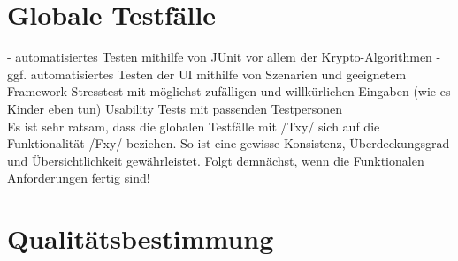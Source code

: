 \documentclass{article}
\begin{document}
\section{Globale Testfälle}
- automatisiertes Testen mithilfe von JUnit vor allem der Krypto-Algorithmen
- ggf. automatisiertes Testen der UI mithilfe von Szenarien und geeignetem Framework
Stresstest mit möglichst zufälligen und willkürlichen Eingaben (wie es Kinder eben tun)
Usability Tests mit passenden Testpersonen\\
Es ist sehr ratsam, dass die globalen Testfälle mit /Txy/ sich auf die Funktionalität /Fxy/ beziehen. So ist eine gewisse Konsistenz, Überdeckungsgrad und Übersichtlichkeit gewährleistet. Folgt demnächst, wenn die Funktionalen Anforderungen fertig sind!

\section{Qualitätsbestimmung}
\end{document}

